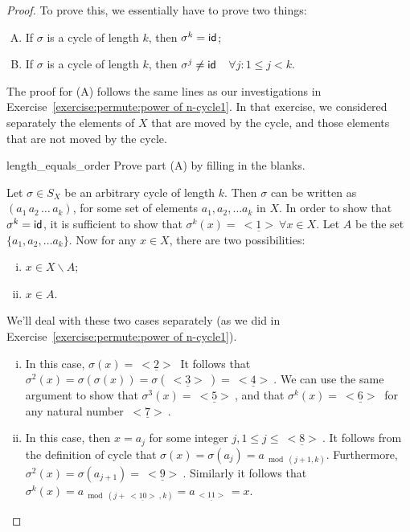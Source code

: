 \begin{proof}
To prove this, we essentially have to prove two things:
\begin{enumerate}[(A)]
\item
If $\sigma$ is a cycle of length $k$, then $\sigma^k = {\sf{i}d} $;
\item
If $\sigma$ is a cycle of length $k$, then $\sigma^j \neq {\sf{i}d} $~~$\forall j: 1 \le j < k.$
\end{enumerate}

\noindent
The proof for (A) follows the same lines as our investigations in Exercise~\ref{exercise:permute:power of n-cycle1}. In that exercise, we considered separately the elements of $X$ that are moved by the cycle, and those elements that are not moved by the cycle. 

\begin{exercise}{length_equals_order} Prove part (A) by filling in the blanks.

\noindent
Let $\sigma \in S_X$ be an arbitrary cycle of length $k$.  Then $\sigma$ can be written as $ (a_1 \, a_2 \, \ldots \, a_k)$, for some set of elements $a_1, a_2, \ldots a_k$ in $X$.  In order to show that $\sigma^k = {\sf{i}d} $, it is sufficient to show that 
$\sigma^k(x) = \underline{~<1>~}  \forall x \in X$. 
Let $A$ be the set  $\{a_1, a_2, \ldots a_k\}$.  Now for any $x \in X$, there are two possibilities:  
\begin{enumerate}[(i)]
\item
$x \in  X \backslash A$;
\item
$x \in A$. 
\end{enumerate}

\noindent
We'll deal with these two cases separately (as we did  in Exercise~\ref{exercise:permute:power of n-cycle1}).

\begin{enumerate}[(i)]
\item
In this case, $\sigma(x) = \underline{~<2>~} $  It follows that $\sigma^2(x) = \sigma( \sigma(x)) = \sigma( \underline{~<3>~}) = \underline{~<4>~}$. We can use the same argument to show that $\sigma^3(x) = \underline{~<5>~}$, and that $\sigma^k(x) = \underline{~<6>~}$ for any natural number $\underline{~<7>~}$.
\item
In this case, then $x = a_j$ for some integer $j, 1 \le j \le \underline{~<8>~}$.  It follows from the definition of cycle that $\sigma(x) = \sigma(a_j) = a_{\bmod(j+1,k)}$. Furthermore, $\sigma^2(x) = \sigma(a_{j+1}) = \underline{~<9>~}$. Similarly it follows that $\sigma^{k}(x) = a_{\bmod(j+ \underline{~<10>~},k)} = a_{\underline{~<11>~}} = x$.
\end{enumerate}


\end{exercise}
\end{proof}
